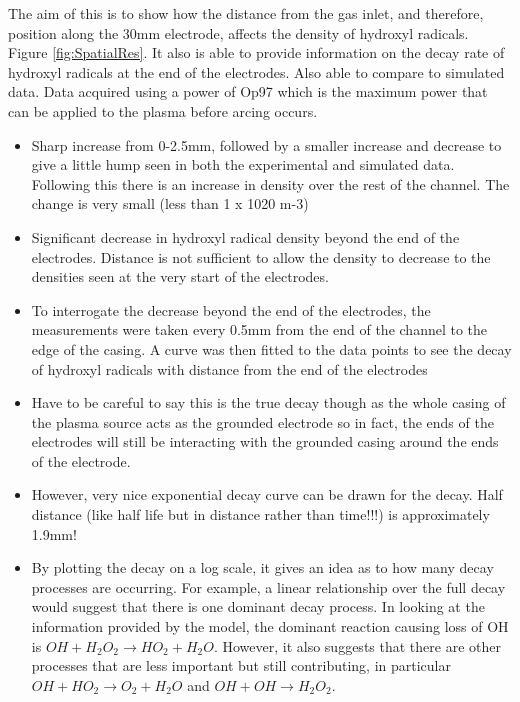\documentclass[11pt, oneside]{article}   	%
\begin{document}
The aim of this is to show how the distance from the gas inlet, and therefore, position along the 30mm electrode, affects the density of hydroxyl radicals. Figure \ref{fig:SpatialRes}.
It also is able to provide information on the decay rate of hydroxyl radicals at the end of the electrodes.
Also able to compare to simulated data.
Data acquired using a power of Op97 which is the maximum power that can be applied to the plasma before arcing occurs.
\begin{itemize}
    \item Sharp increase from 0-2.5mm, followed by a smaller increase and decrease to give a little hump seen in both the experimental and simulated data. Following this there is an increase in density over the rest of the channel. The change is very small (less than 1 x 1020 m-3)
   
    \item Significant decrease in hydroxyl radical density beyond the end of the electrodes. Distance is not sufficient to allow the density to decrease to the densities seen at the very start of the electrodes. 
        
    \item To interrogate the decrease beyond the end of the electrodes, the measurements were taken every 0.5mm from the end of the channel to the edge of the casing. A curve was then fitted to the data points to see the decay of hydroxyl radicals with distance from the end of the electrodes
    
    \item Have to be careful to say this is the true decay though as the whole casing of the plasma source acts as the grounded electrode so in fact, the ends of the electrodes will still be interacting with the grounded casing around the ends of the electrode.
    
    \item However, very nice exponential decay curve can be drawn for the decay. Half distance (like half life but in distance rather than time!!!) is approximately 1.9mm!
    
    \item By plotting the decay on a log scale, it gives an idea as to how many decay processes are occurring. For example, a linear relationship over the full decay would suggest that there is one dominant decay process. 
    In looking at the information provided by the model, the dominant reaction causing loss of OH is $OH + H_2O_2 \rightarrow  HO_2 + H_2O$. However, it also suggests that there are other processes that are less important but still contributing, in particular $OH +HO_2 \rightarrow O_2 +H_2O$ and  $OH + OH \rightarrow H_2O_2$.
\end{itemize}
\end{document}
